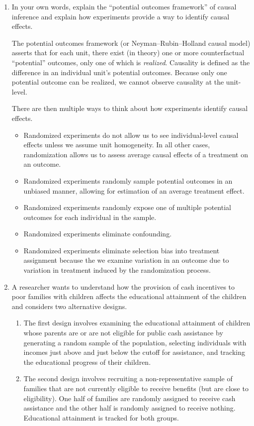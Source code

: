 \documentclass[a4paper,12pt]{exam}
\begin{document}
\begin{enumerate}
\item  In your own words, explain the ``potential outcomes framework'' of causal inference and explain how experiments provide a way to identify causal effects.

\begin{solution}

The potential outcomes framework (or Neyman--Rubin--Holland causal model) asserts that for each unit, there exist (in theory) one or more counterfactual ``potential'' outcomes, only one of which is \textit{realized}. Causality is defined as the difference in an individual unit's potential outcomes. Because only one potential outcome can be realized, we cannot observe causality at the unit-level.

There are then multiple ways to think about how experiments identify causal effects.

\begin{itemize}
\item Randomized experiments do not allow us to see individual-level causal effects unless we assume unit homogeneity. In all other cases, randomization allows us to assess average causal effects of a treatment on an outcome.
\item Randomized experiments randomly sample potential outcomes in an unbiased manner, allowing for estimation of an average treatment effect.
\item Randomized experiments randomly expose one of multiple potential outcomes for each individual in the sample.
\item Randomized experiments eliminate confounding.
\item Randomized experiments eliminate selection bias into treatment assignment because the we examine variation in an outcome due to variation in treatment induced by the randomization process.
\end{itemize}

\end{solution}

\item A researcher wants to understand how the provision of cash incentives to poor families with children affects the educational attainment of the children and considers two alternative designs.

\begin{enumerate}
\item The first design involves examining the educational attainment of children whose parents are or are not eligible for public cash assistance by generating a random sample of the population, selecting individuals with incomes just above and just below the cutoff for assistance, and tracking the educational progress of their children.
\item The second design involves recruiting a non-representative sample of families that are not currently eligible to receive benefits (but are close to eligibility). One half of families are randomly assigned to receive cash assistance and the other half is randomly assigned to receive nothing. Educational attainment is tracked for both groups.
\end{enumerate}


\end{enumerate}
\end{document}
